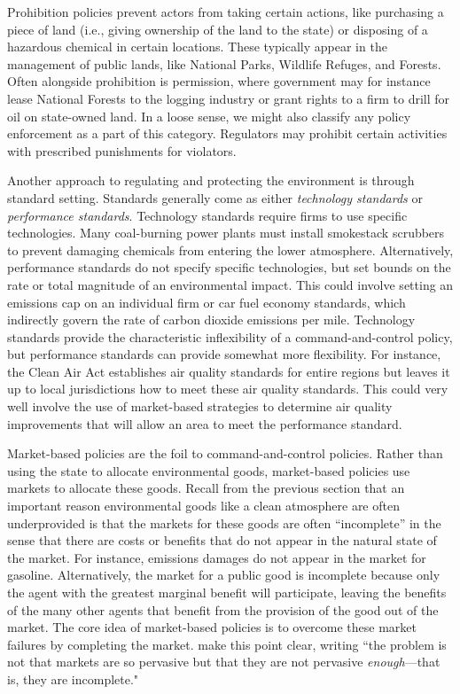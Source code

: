 Prohibition policies prevent actors from taking certain actions, like purchasing a piece of land (i.e., giving ownership of the land to the state) or disposing of a hazardous chemical in certain locations. These typically appear in the management of public lands, like National Parks, Wildlife Refuges, and Forests. Often alongside prohibition is permission, where government may for instance lease National Forests to the logging industry or grant rights to a firm to drill for oil on state-owned land. In a loose sense, we might also classify any policy enforcement as a part of this category. Regulators may prohibit certain activities with prescribed punishments for violators. 

Another approach to regulating and protecting the environment is through standard setting. Standards generally come as either \emph{technology standards} or \emph{performance standards}. Technology standards require firms to use specific technologies. Many coal-burning power plants must install smokestack scrubbers to prevent damaging chemicals from entering the lower atmosphere. Alternatively, performance standards do not specify specific technologies, but set bounds on the rate or total magnitude of an environmental impact. This could involve setting an emissions cap on an individual firm or car fuel economy standards, which indirectly govern the rate of carbon dioxide emissions per mile. Technology standards provide the characteristic inflexibility of a command-and-control policy, but performance standards can provide somewhat more flexibility. For instance, the Clean Air Act establishes air quality standards for entire regions but leaves it up to local jurisdictions how to meet these air quality standards. This could very well involve the use of market-based strategies to determine air quality improvements that will allow an area to meet the performance standard.


Market-based policies are the foil to command-and-control policies. Rather than using the state to allocate environmental goods, market-based policies use markets to allocate these goods. Recall from the previous section that an important reason environmental goods like a clean atmosphere are often underprovided is that the markets for these goods are often ``incomplete'' in the sense that there are costs or benefits that do not appear in the natural state of the market. For instance, emissions damages do not appear in the market for gasoline. Alternatively, the market for a public good is incomplete because only the agent with the greatest marginal benefit will participate, leaving the benefits of the many other agents that benefit from the provision of the good out of the market. The core idea of market-based policies is to overcome these market failures by completing the market. \cite{keohane2016markets} make this point clear, writing ``the problem is not that markets are so pervasive but that they are not pervasive \emph{enough}---that is, they are incomplete." 


